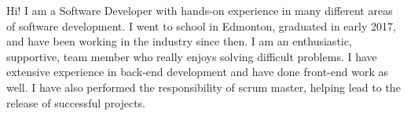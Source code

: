 Hi!  I am a Software Developer with hands-on experience in many different areas of software development.  I went to school in Edmonton, graduated in early 2017, and have been working in the industry since then.  I am an enthusiastic, supportive, team member who really enjoys solving difficult problems.  I have extensive experience in back-end development and have done front-end work as well.  I have also performed the responsibility of scrum master, helping lead to the release of successful projects.